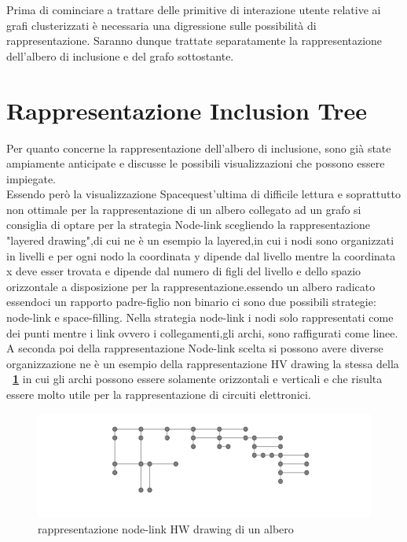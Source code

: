 \large{
Prima di cominciare a trattare delle primitive di interazione utente relative ai grafi clusterizzati è necessaria una digressione sulle possibilità di rappresentazione. Saranno dunque trattate separatamente la rappresentazione dell'albero di inclusione e del grafo sottostante.
\section{Rappresentazione Inclusion Tree}
Per quanto concerne la rappresentazione dell'albero di inclusione, sono già state ampiamente anticipate e discusse le possibili visualizzazioni che possono essere impiegate.\\
Essendo però la visualizzazione Spacequest'ultima di difficile lettura e soprattutto non ottimale per la rappresentazione di un albero collegato ad un grafo si consiglia di optare per la strategia Node-link scegliendo la rappresentazione "layered drawing",di cui ne è un esempio la \figurename{layered},in cui i nodi sono organizzati in livelli e per ogni nodo la coordinata y dipende dal livello mentre la coordinata x deve esser trovata e dipende dal numero di figli del livello e dello spazio orizzontale a disposizione per la rappresentazione.essendo un albero radicato essendoci un rapporto padre-figlio non binario ci sono due possibili strategie: node-link e space-filling.
Nella strategia node-link i nodi solo rappresentati come dei punti mentre i link ovvero i collegamenti,gli archi, sono raffigurati come linee. A seconda poi della rappresentazione Node-link scelta si possono avere diverse organizzazione ne è un esempio della rappresentazione HV drawing la stessa della \textbf{\figurename~\ref{fig:nodeLink}} in cui gli archi possono essere solamente orizzontali e verticali e che risulta essere molto utile per la rappresentazione di circuiti elettronici.
\begin{figure}[!htb]
	\begin{center}
		\includegraphics[width=0.8 \linewidth]{figure/nodeLink}
	\end{center}
	\caption{rappresentazione node-link HW drawing di un albero \label{fig:nodeLink}}
\end{figure}

}
